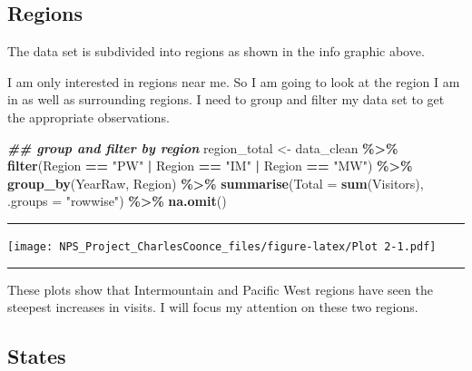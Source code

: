 \documentclass[
]{article}
\newenvironment{Shaded}{\begin{snugshade}}{\end{snugshade}}
\newcommand{\AttributeTok}[1]{\textcolor[rgb]{0.13,0.29,0.53}{#1}}
\newcommand{\DocumentationTok}[1]{\textcolor[rgb]{0.56,0.35,0.01}{\textbf{\textit{#1}}}}
\newcommand{\FunctionTok}[1]{\textcolor[rgb]{0.13,0.29,0.53}{\textbf{#1}}}
\newcommand{\NormalTok}[1]{#1}
\newcommand{\OtherTok}[1]{\textcolor[rgb]{0.56,0.35,0.01}{#1}}
\newcommand{\SpecialCharTok}[1]{\textcolor[rgb]{0.81,0.36,0.00}{\textbf{#1}}}
\newcommand{\StringTok}[1]{\textcolor[rgb]{0.31,0.60,0.02}{#1}}
\begin{document}
\newpage

\subsection{Regions}\label{regions}

The data set is subdivided into regions as shown in the info graphic
above.

I am only interested in regions near me. So I am going to look at the
region I am in as well as surrounding regions. I need to group and
filter my data set to get the appropriate observations.

\begin{Shaded}
\begin{Highlighting}[]
  \DocumentationTok{\#\# group and filter by region}
\NormalTok{region\_total }\OtherTok{\textless{}{-}}\NormalTok{ data\_clean }\SpecialCharTok{\%\textgreater{}\%}
  \FunctionTok{filter}\NormalTok{(Region }\SpecialCharTok{==} \StringTok{"PW"} \SpecialCharTok{|}\NormalTok{ Region }\SpecialCharTok{==} \StringTok{"IM"} \SpecialCharTok{|}
\NormalTok{         Region }\SpecialCharTok{==} \StringTok{"MW"}\NormalTok{) }\SpecialCharTok{\%\textgreater{}\%}
  \FunctionTok{group\_by}\NormalTok{(YearRaw, Region) }\SpecialCharTok{\%\textgreater{}\%} 
  \FunctionTok{summarise}\NormalTok{(}\AttributeTok{Total =} \FunctionTok{sum}\NormalTok{(Visitors), }\AttributeTok{.groups =} \StringTok{"rowwise"}\NormalTok{) }\SpecialCharTok{\%\textgreater{}\%}
  \FunctionTok{na.omit}\NormalTok{()}
\end{Highlighting}
\end{Shaded}

\begin{center}\rule{0.5\linewidth}{0.5pt}\end{center}

\texttt{[image: NPS\_Project\_CharlesCoonce\_files/figure-latex/Plot 2-1.pdf]}

\begin{center}\rule{0.5\linewidth}{0.5pt}\end{center}

These plots show that Intermountain and Pacific West regions have seen
the steepest increases in visits. I will focus my attention on these two
regions.

\label{visitation_trends_states}
\subsection{States}\label{states}
\end{document}
